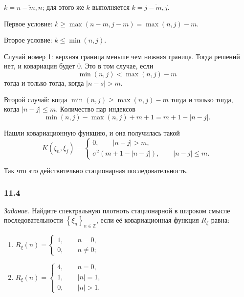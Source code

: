 $k = \overline{n - m, n}$; для этого же $k$ выполняется $k = \overline{j - m, j}$.

Первое условие: $k \geq \max \left( n - m, j - m \right) = \max \left( n, j \right) - m$.

Второе условие: $k \leq \min \left( n, j \right) $.

Случай номер 1: верхняя граница меньше чем нижняя граница.
Тогда решений нет, и ковариация будет 0.
Это в том случае, если
\begin{equation*}
  \min \left( n, j \right) < \max \left( n, j \right) - m
\end{equation*}
тогда и только тогда, когда $ \left| n - s \right| > m$.

Второй случай:
когда $ \min \left( n, j \right) \geq \max \left( n, j \right) - m$ тогда и только тогда,
когда $ \left| n - j \right| \leq m$.
Количество пар индексов
\begin{equation*}
  \min \left( n, j \right) - \max \left( n, j \right) + m + 1 =
  m + 1 - \left| n - j \right|.
\end{equation*}

Нашли ковариационную функцию, и она получилась такой
\begin{equation*}
  K \left( \xi_n, \xi_j \right) =
  \begin{cases}
    0, \qquad \left| n - j \right| > m, \\
    \sigma^2 \left( m + 1 - \left| n - j \right| \right), \qquad \left| n - j \right| \leq m.
  \end{cases}
\end{equation*}

Так что это действительно стационарная последовательность.

\subsubsection*{11.4}

\textit{Задание.}
Найдите спектральную плотноть стационарной в широком смысле последовательности
$ \left\{ \xi_n \right\}_{n \in \mathbb{Z}}$, если её ковариационная функция $R_{ \xi }$ равна:
\begin{enumerate}[label=\alph*)]
  \item $R_{ \xi } \left( n \right) =
    \begin{cases}
      1, \qquad n = 0, \\
      0, \qquad n \neq 0;
    \end{cases}$
  \item $R_{ \xi } \left( n \right) =
    \begin{cases}
      4, \qquad n = 0, \\
      1, \qquad \left| n \right| = 1, \\
      0, \qquad \left| n \right| > 1.
    \end{cases}$
\end{enumerate}

